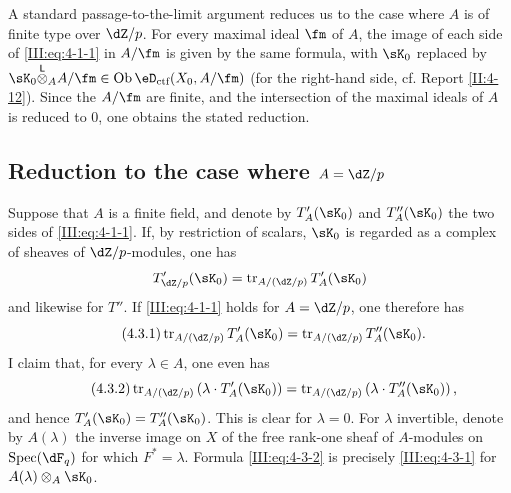 A standard passage-to-the-limit argument reduces us to the case where $A$ is
of finite type over $\dZ/p$. For every maximal ideal $\fm$ of $A$, the image
of each side of \eqref{III:eq:4-1-1} in $A/\fm$ is given by the same formula,
with $\sK_0$ replaced by
$\sK_0\lotimes_A A/\fm\in\ob\eD_\text{ctf}(X_0,A/\fm)$ (for the right-hand
side, cf. Report \ref{II:4-12}). Since the $A/\fm$ are finite, and the
intersection of the maximal ideals of $A$ is reduced to $0$, one obtains the
stated reduction.






\subsection{Reduction to the case where \texorpdfstring{$A=\dZ/p$}{A=Z/p}}\label{III:4-3}

Suppose that $A$ is a finite field, and denote by $T_A'(\sK_0)$ and
$T_A''(\sK_0)$ the two sides of \eqref{III:eq:4-1-1}. If, by restriction of
scalars, $\sK_0$ is regarded as a complex of sheaves of $\dZ/p$-modules, one
has
\[
  T_{\dZ/p}'(\sK_0) = \tr_{A/(\dZ/p)} T_A'(\sK_0)
\]
and likewise for $T''$. If \eqref{III:eq:4-1-1} holds for $A=\dZ/p$, one
therefore has
\begin{equation*}\tag{4.3.1}\label{III:eq:4-3-1}
  \tr_{A/(\dZ/p)} T_A'(\sK_0) = \tr_{A/(\dZ/p)} T_A''(\sK_0) \text{.}
\end{equation*}
I claim that, for every $\lambda\in A$, one even has
\begin{equation*}\tag{4.3.2}\label{III:eq:4-3-2}
  \tr_{A/(\dZ/p)}\left(\lambda\cdot T_A'(\sK_0)\right) = \tr_{A/(\dZ/p)}\left(\lambda\cdot T_A''(\sK_0)\right) \text{,}
\end{equation*}
and hence $T_A'(\sK_0) = T_A''(\sK_0)$. This is clear for $\lambda=0$. For
$\lambda$ invertible, denote by $A(\lambda)$ the inverse image on $X$ of the
free rank-one sheaf of $A$-modules on $\spec(\dF_q)$ for which
$F^*=\lambda$. Formula \eqref{III:eq:4-3-2} is precisely
\eqref{III:eq:4-3-1} for $A(\lambda)\otimes_A \sK_0$.






